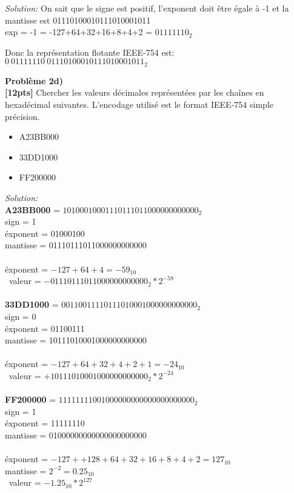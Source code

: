 \documentclass{article}
\newenvironment{problem}[2][Problème]
    { \begin{mdframed}[backgroundcolor=gray!20] \textbf{#1 #2} \\}
    {  \end{mdframed}}
\newenvironment{solution}
    {\textit{Solution:}}
    {}
\begin{document}
\begin{solution}
    On sait que le signe est positif, l'exponent doit être égale à -1 et la mantisse est 01110100010111010001011\\

    exp = -1 = -127+64+32+16+8+4+2 = $01111110_2$

    Donc la représentation flotante IEEE-754 est: \\
    $0\ 01111110\ 01110100010111010001011_2$ 
\end{solution}


\begin{problem}{2d)}
\textbf{[12pts]} Chercher les valeurs décimales représentées par les chaînes en hexadécimal
suivantes. L’encodage utilisé est le format IEEE-754 simple précision.
\begin{itemize}
    \item A23BB000
    \item 33DD1000
    \item FF200000
\end{itemize}
\end{problem}

\begin{solution}
    \\
    \textbf{A23BB000} = $1010 0010 0011 1011 1011 0000 0000 0000_2$ \\
    sign = 1 \\
    éxponent = 01000100 \\
    mantisse = 01110111011000000000000 \\
    \\
    éxponent = $-127 + 64 + 4 = -59_{10}$ \\
    \
    valeur = $- 01110111011000000000000_2 * 2^{-59}$
    \\\\
    \textbf{33DD1000} = $0011 0011 1101 1101 0001 0000 0000 0000_2$ \\
    sign = 0 \\
    éxponent = 01100111 \\
    mantisse = 10111010001000000000000 \\
    \\
    éxponent = $-127 + 64 + 32 + 4 + 2 + 1 = -24_{10}$ \\
    \
    valeur = $+ 10111010001000000000000_2 * 2^{-24}$
    \\\\
    \textbf{FF200000} = $1111 1111 0010 0000 0000 0000 0000 0000_2$ \\
    sign = 1 \\
    éxponent = 11111110 \\
    mantisse = 01000000000000000000000 \\
    \\
    éxponent = $-127 + + 128 + 64 + 32 + 16 + 8 + 4 + 2 = 127_{10}$ \\
    mantisse = $2^{-2} = 0.25_{10}$ \\
    \
    valeur = $- 1.25_{10} * 2^{127}$
\end{solution}
\end{document}
